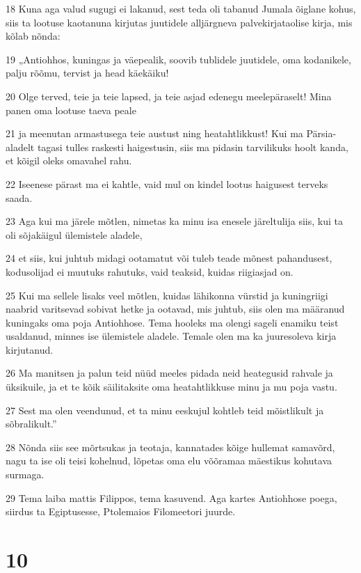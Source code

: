 \par 18 Kuna aga valud sugugi ei lakanud, sest teda oli tabanud Jumala õiglane kohus, siis ta lootuse kaotanuna kirjutas juutidele alljärgneva palvekirjataolise kirja, mis kõlab nõnda:
\par 19 „Antiohhos, kuningas ja väepealik, soovib tublidele juutidele, oma kodanikele, palju rõõmu, tervist ja head käekäiku!
\par 20 Olge terved, teie ja teie lapsed, ja teie asjad edenegu meelepäraselt! Mina panen oma lootuse taeva peale
\par 21 ja meenutan armastusega teie austust ning heatahtlikkust! Kui ma Pärsia-aladelt tagasi tulles raskesti haigestusin, siis ma pidasin tarvilikuks hoolt kanda, et kõigil oleks omavahel rahu.
\par 22 Iseenese pärast ma ei kahtle, vaid mul on kindel lootus haigusest terveks saada.
\par 23 Aga kui ma järele mõtlen, nimetas ka minu isa enesele järeltulija siis, kui ta oli sõjakäigul ülemistele aladele,
\par 24 et siis, kui juhtub midagi ootamatut või tuleb teade mõnest pahandusest, kodusolijad ei muutuks rahutuks, vaid teaksid, kuidas riigiasjad on.
\par 25 Kui ma sellele lisaks veel mõtlen, kuidas lähikonna vürstid ja kuningriigi naabrid varitsevad sobivat hetke ja ootavad, mis juhtub, siis olen ma määranud kuningaks oma poja Antiohhose. Tema hooleks ma olengi sageli enamiku teist usaldanud, minnes ise ülemistele aladele. Temale olen ma ka juuresoleva kirja kirjutanud.
\par 26 Ma manitsen ja palun teid nüüd meeles pidada neid heategusid rahvale ja üksikuile, ja et te kõik säilitaksite oma heatahtlikkuse minu ja mu poja vastu.
\par 27 Sest ma olen veendunud, et ta minu eeskujul kohtleb teid mõistlikult ja sõbralikult.”
\par 28 Nõnda siis see mõrtsukas ja teotaja, kannatades kõige hullemat samavõrd, nagu ta ise oli teisi kohelnud, lõpetas oma elu võõramaa mäestikus kohutava surmaga.
\par 29 Tema laiba mattis Filippos, tema kasuvend. Aga kartes Antiohhose poega, siirdus ta Egiptusesse, Ptolemaios Filomeetori juurde.



\chapter{10}


